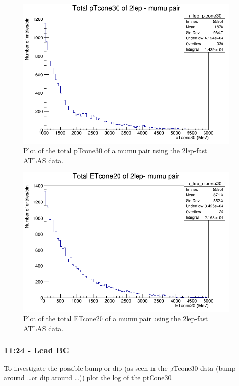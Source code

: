 \begin{figure}[h!]
    \centering
    \includegraphics[width=0.85\linewidth]{plots/16-02-2021/2lep_fast_mumu-pair_pTcone30(total)_1-6GeV_16-02-21_11-06}
    \caption{Plot of the total pTcone30 of a mumu pair using the 2lep-fast ATLAS data. }\label{fig:2lep_fast_mumu-pair_pTcone30(total)_1-6GeV_16-02-21_11-06}
\end{figure}

\begin{figure}[h!]
    \centering
    \includegraphics[width=0.85\linewidth]{plots/16-02-2021/2lep_fast_mumu-pair_ETcone30(total)_0-5GeV_16-02-21_11-14}
    \caption{Plot of the total ETcone20 of a mumu pair using the 2lep-fast ATLAS data. }\label{fig:2lep_fast_mumu-pair_ETcone30(total)_0-5GeV_16-02-21_11-14}
\end{figure}



\subsubsection*{11:24 - Lead BG}
To investigate the possible bump or dip (as seen in the pTcone30 data (bump around \dots  or dip around \dots)) plot the log of the ptCone30.


